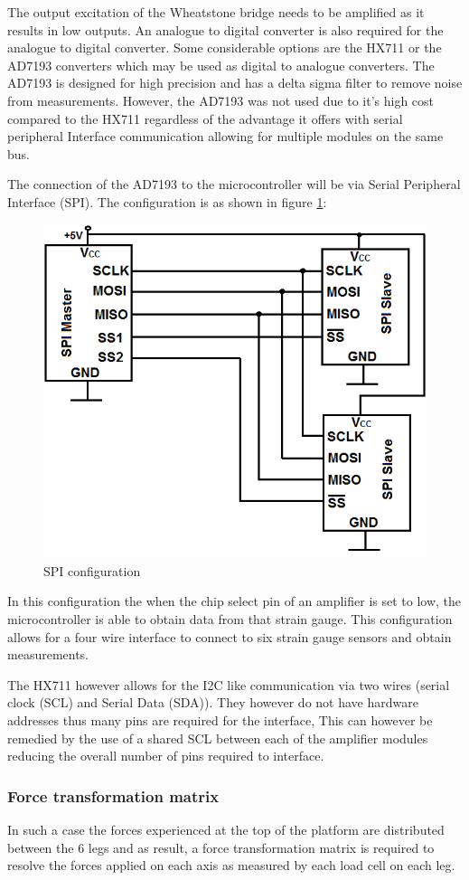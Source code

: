 The output excitation of the Wheatstone bridge needs to be amplified as it results in low outputs. An analogue to digital converter is also required for the analogue to digital converter. Some considerable options are the HX711 or the AD7193 converters which may be used as digital to analogue converters. The AD7193 is designed for high precision and has a delta sigma filter to remove noise from measurements.  However, the AD7193 was not used due to it's high cost compared to the HX711 regardless of the advantage it offers with serial peripheral Interface communication allowing for multiple modules on the same bus.

The connection of the AD7193 to the microcontroller will be via Serial Peripheral Interface (SPI). The configuration is as shown in figure \ref{spi}:
\begin{center}
\begin{figure}[H]
\centering
\includegraphics[width=0.55\linewidth]{Figures/SPI}
\caption[SPI configuration]{SPI configuration}
\label{spi}
\end{figure}
\end{center}
In this configuration the when the chip select pin of an amplifier is set to low, the microcontroller is able to obtain data from that strain gauge. This configuration allows for a four wire interface to connect to six strain gauge sensors and obtain measurements.

The HX711 however allows for the I2C like communication via two wires (serial clock (SCL) and Serial Data (SDA)). They however do not have hardware addresses thus many pins are required for the interface, This can however be remedied by the use of a shared SCL between each of the amplifier modules reducing the overall number of pins required to interface.

\subsubsection*{Force transformation matrix} 
In such a case the forces experienced at the top of the platform are distributed between the 6 legs and as result, a force transformation matrix is required to resolve the forces applied on each axis as measured by each load cell on each leg. 

